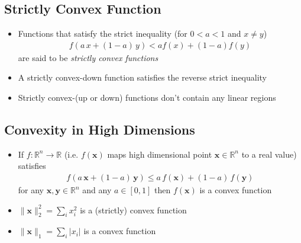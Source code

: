 \begin{slide}
\section{Strictly Convex Function}

\begin{PauseHighLight}
  \begin{itemize}
  \item Functions that satisfy the strict inequality (for $0<a<1$ and
    $x\neq y$)
    \begin{align*}
      f(a \,x + (1-a)\, y) < a f(x) + (1-a) f(y)
    \end{align*}
    are said to be \emph{strictly convex functions}\pause
  \item A strictly convex-down function satisfies the reverse strict
    inequality\pause
  \item Strictly convex-(up or down) functions don't contain any
    linear regions\pause
  \end{itemize}
\end{PauseHighLight}

\end{slide}



\begin{slide}
\section{Convexity in High Dimensions}

\begin{PauseHighLight}
  \begin{itemize}
  \item If $f:\mathbb{R}^n \to \mathbb{R}$ (i.e. $f(\bm{x})$ maps
    high dimensional point $\bm{x}\in \mathbb{R}^n$ to a real value)
    satisfies
    \begin{align*}
      f(a \,\bm{x} + (1-a)\, \bm{y}) \leq  a \, f(\bm{x}) + (1-a) \, f(\bm{y})
    \end{align*}
    for any $\bm{x}, \bm{y}\in \mathbb{R}^n$ and any $a\in[0,1]$
    then $f(\bm{x})$ is a convex function\pause
  \item $\|\bm{x}\|_2^2 = \sum\limits_i x_i^2$ is a (strictly) convex function\pause
  \item $\|\bm{x}\|_1 = \sum\limits_i |x_i|$ is a convex function\pause
  \end{itemize}
\end{PauseHighLight}

\end{slide}


